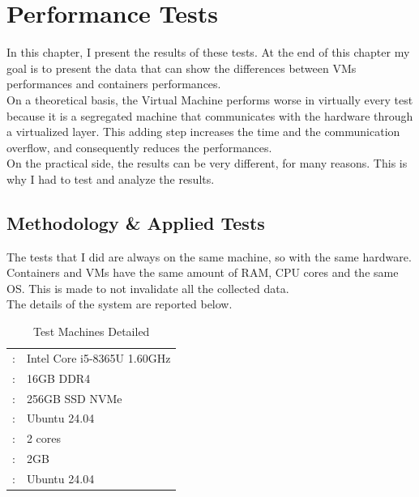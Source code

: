\chapter{Performance Tests}

In this chapter, I present the results of these tests. At the end of this chapter my goal is to present the data that can show the differences between VMs performances and containers performances. \\
On a theoretical basis, the Virtual Machine performs worse in virtually every test because it is a segregated machine that communicates with the hardware through a virtualized layer. This adding step increases the time and the communication overflow, and consequently reduces the performances. \\
On the practical side, the results can be very different, for many reasons. This is why I had to test and analyze the results.

\section{Methodology \& Applied Tests}

The tests that I did are always on the same machine, so with the same hardware. Containers and VMs have the same amount of RAM, CPU cores and the same OS. This is made to not invalidate all the collected data. \\
The details of the system are reported below.

\begin{table}[H]
    \centering
    \begin{tabular}{r|l}
        \color{UniOrange}{CPU}:             & Intel Core i5-8365U 1.60GHz \\
        \color{UniOrange}{RAM}:             & 16GB DDR4                   \\
        \color{UniOrange}{DISK}:            & 256GB SSD NVMe              \\
        \color{UniOrange}{LOCAL HOST OS}:   & Ubuntu 24.04                \\
        \color{UniOrange}{CORE USED}:       & 2 cores                     \\
        \color{UniOrange}{RAM USED}:        & 2GB                         \\
        \color{UniOrange}{TEST MACHINE OS}: & Ubuntu 24.04                \\
    \end{tabular}
    \caption{Test Machines Detailed}
    \label{tab:hardware_details}
\end{table}

